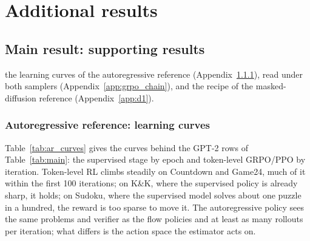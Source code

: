 \section{Additional results}
\label{app:results}

\subsection{Main result: supporting results}
the learning curves of the autoregressive reference (Appendix~\ref{app:ar_curves}), \methodGRPO{} read under both samplers (Appendix~\ref{app:grpo_chain}), and the recipe of the masked-diffusion reference (Appendix~\ref{app:d1}).

\subsubsection{Autoregressive reference: learning curves}
\label{app:ar_curves}
Table~\ref{tab:ar_curves} gives the curves behind the GPT-2 rows of Table~\ref{tab:main}: the supervised stage by epoch and token-level GRPO/PPO by iteration. Token-level RL climbs steadily on Countdown and Game24, much of it within the first 100 iterations; on K\&K, where the supervised policy is already sharp, it holds; on Sudoku, where the supervised model solves about one puzzle in a hundred, the reward is too sparse to move it. The autoregressive policy sees the same problems and verifier as the flow policies and at least as many rollouts per iteration; what differs is the action space the estimator acts on.

